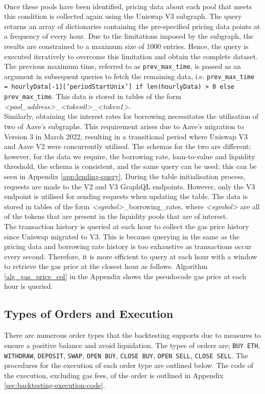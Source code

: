 \\[3mm]
Once these pools have been identified, pricing data about each pool that meets this condition is collected again using the Uniswap V3 subgraph. The query returns an array of dictionaries containing the pre-specified pricing data points at a frequency of every hour. Due to the limitations imposed by the subgraph, the results are constrained to a maximum size of 1000 entries. Hence, the query is executed iteratively to overcome this limitation and obtain the complete dataset. The previous maximum time, referred to as \texttt{prev\_max\_time}, is passed as an argument in subsequent queries to fetch the remaining data, i.e. \texttt{prev\_max\_time = hourlyData[-1]['periodStartUnix'] if len(hourlyData) > 0 else prev\_max\_time}. This data is stored in tables of the form \textit{<pool\_address>}\_\textit{<token0>}\_\textit{<token1>}.
\\[3mm]
Similarly, obtaining the interest rates for borrowing necessitates the utilisation of two of Aave's subgraphs. This requirement arises due to Aave's migration to Version 3 in March 2022, resulting in a transitional period where Uniswap V3 and Aave V2 were concurrently utilised. The schemas for the two are different; however, for the data we require, the borrowing rate, loan-to-value and liquidity threshold, the schema is consistent, and the same query can be used; this can be seen in Appendix \ref{app:lending-query}. During the table initialisation process, requests are made to the V2 and V3 GraphQL endpoints. However, only the V3 endpoint is utilised for sending requests when updating the table. The data is stored in tables of the form \textit{<symbol>}\_borrowing\_rates, where \textit{<symbol>} are all of the tokens that are present in the liquidity pools that are of interest.
\\[3mm]
The transaction history is queried at each hour to collect the gas price history since Uniswap migrated to V3. This is because querying in the same as the pricing data and borrowing rate history is too exhaustive as transactions occur every second. Therefore, it is more efficient to query at each hour with a window to retrieve the gas price at the closest hour as follows. Algorithm \ref{alg_gas_price_col} in the Appendix shows the pseudocode gas price at each hour is queried. 
\subsection{Types of Orders and Execution}
There are numerous order types that the backtesting supports due to measures to ensure a positive balance and avoid liquidation. The types of orders are; \texttt{BUY\ ETH}, \texttt{WITHDRAW}, \texttt{DEPOSIT}, \texttt{SWAP}, \texttt{OPEN\ BUY}, \texttt{CLOSE\ BUY}, \texttt{OPEN\ SELL}, \texttt{CLOSE\ SELL}. The procedures for the execution of each order type are outlined below. The code of the execution, excluding gas fees, of the order is outlined in Appendix \ref{sec:backtesting-execution-code}.
\vspace{-3mm}

